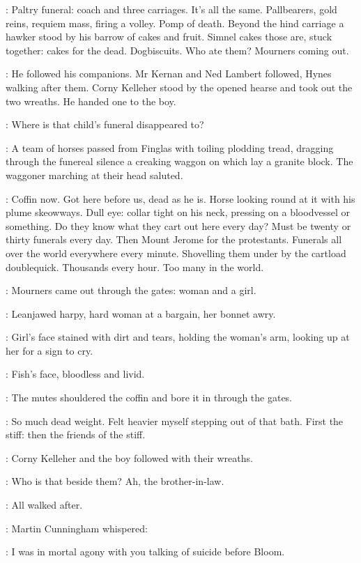 \BloomInt:
Paltry funeral:
coach and three carriages.
It's all the same.
Pallbearers, gold reins, requiem mass, firing a volley.
Pomp of death.
Beyond the hind carriage
a hawker stood by his barrow of cakes and fruit.
Simnel cakes those are, stuck together:
cakes for the dead.
Dogbiscuits.
Who ate them?
Mourners coming out.

:
He followed his companions.
Mr Kernan and Ned Lambert followed,
Hynes walking after them.
Corny Kelleher stood by the opened hearse and took out the two wreaths.
He handed one to the boy.

\BloomInt:
Where is that child's funeral disappeared to?

:
A team of horses passed from Finglas with toiling plodding tread,
dragging through the funereal silence a creaking waggon
on which lay a granite block.
The waggoner marching at their head saluted.

\BloomInt:
Coffin now.
Got here before us, dead as he is.
Horse looking round at it with his plume skeowways.
Dull eye:
collar tight on his neck,
pressing on a bloodvessel or something.
Do they know what they cart out here every day?
Must be twenty or thirty funerals every day.
Then Mount Jerome for the protestants.
Funerals all over the world
everywhere every minute.
Shovelling them under by the cartload doublequick.
Thousands every hour.
Too many in the world.

:
Mourners came out through the gates:
woman and a girl.

\BloomInt:
Leanjawed harpy, hard woman at a bargain, her bonnet awry.

:
Girl's face stained with dirt and tears,
holding the woman's arm, looking up at her for a sign to cry.

\BloomInt:
Fish's face,
bloodless and livid.

:
The mutes shouldered the coffin and bore it in through the gates.

\BloomInt:
So much dead weight.
Felt heavier myself stepping out of that bath.
First the stiff:
then the friends of the stiff.

:
Corny Kelleher and the boy followed with their wreaths.

\BloomInt:
Who is that beside them?
Ah, the brother-in-law.

:
All walked after.

:
Martin Cunningham whispered:

\cunningham:
I was in mortal agony with you talking of suicide before Bloom.

